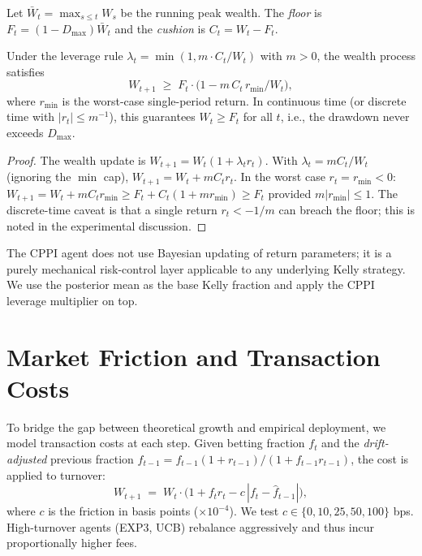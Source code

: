 \begin{definition}
Let $\bar W_t = \max_{s \leq t} W_s$ be the running peak wealth.  The
\emph{floor} is $F_t = (1 - D_{\max})\bar W_t$ and the \emph{cushion} is
$C_t = W_t - F_t$.
\end{definition}

\begin{proposition}
\label{prop:cppi_bound}
Under the leverage rule $\lambda_t = \min(1, m \cdot C_t / W_t)$ with
$m > 0$, the wealth process satisfies
\[
    W_{t+1} \;\geq\; F_t \cdot \bigl(1 - m\,C_t\,r_{\min} / W_t\bigr),
\]
where $r_{\min}$ is the worst-case single-period return.  In continuous
time (or discrete time with $|r_t| \leq m^{-1}$), this guarantees
$W_t \geq F_t$ for all $t$, i.e., the drawdown never exceeds $D_{\max}$.
\end{proposition}

\begin{proof}
The wealth update is
$W_{t+1} = W_t(1 + \lambda_t r_t)$.
With $\lambda_t = m C_t / W_t$ (ignoring the $\min$ cap),
$W_{t+1} = W_t + m C_t r_t$.
In the worst case $r_t = r_{\min} < 0$:
$W_{t+1} = W_t + m C_t r_{\min} \geq F_t + C_t(1 + m r_{\min}) \geq F_t$
provided $m |r_{\min}| \leq 1$.  The discrete-time caveat is that a single
return $r_t < -1/m$ can breach the floor; this is noted in the experimental
discussion.
\end{proof}

The CPPI agent does not use Bayesian updating of return parameters; it is a
purely mechanical risk-control layer applicable to any underlying Kelly
strategy.  We use the posterior mean as the base Kelly fraction and apply
the CPPI leverage multiplier on top.

\section{Market Friction and Transaction Costs}

To bridge the gap between theoretical growth and empirical deployment, we
model transaction costs at each step.  Given betting fraction $f_t$ and the
\emph{drift-adjusted} previous fraction
$\hat f_{t-1} = f_{t-1}(1+r_{t-1}) / (1 + f_{t-1} r_{t-1})$, the
cost is applied to turnover:
\begin{equation}
    W_{t+1} \;=\; W_t \cdot \bigl(1 + f_t r_t - c\,|f_t - \hat f_{t-1}|\bigr),
    \label{eq:friction}
\end{equation}
where $c$ is the friction in basis points ($\times 10^{-4}$).  We test
$c \in \{0, 10, 25, 50, 100\}$ bps.  High-turnover agents (EXP3, UCB)
rebalance aggressively and thus incur proportionally higher fees.

